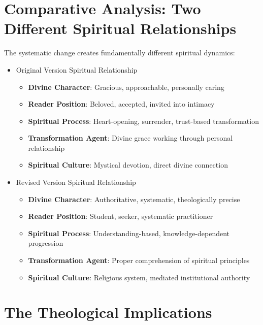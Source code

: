 \documentclass[11pt,twoside]{book}
\begin{document}
\section*{Comparative Analysis: Two Different Spiritual Relationships}
\label{sec:orge22e9e4}

The systematic change creates fundamentally different spiritual dynamics:
\begin{itemize}
\item Original Version Spiritual Relationship
\label{sec:org5c1df6e}
\begin{itemize}
\item \textbf{\textbf{Divine Character}}: Gracious, approachable, personally caring
\item \textbf{\textbf{Reader Position}}: Beloved, accepted, invited into intimacy
\item \textbf{\textbf{Spiritual Process}}: Heart-opening, surrender, trust-based transformation
\item \textbf{\textbf{Transformation Agent}}: Divine grace working through personal relationship
\item \textbf{\textbf{Spiritual Culture}}: Mystical devotion, direct divine connection
\end{itemize}
\item Revised Version Spiritual Relationship
\label{sec:org80bb000}
\begin{itemize}
\item \textbf{\textbf{Divine Character}}: Authoritative, systematic, theologically precise
\item \textbf{\textbf{Reader Position}}: Student, seeker, systematic practitioner
\item \textbf{\textbf{Spiritual Process}}: Understanding-based, knowledge-dependent progression
\item \textbf{\textbf{Transformation Agent}}: Proper comprehension of spiritual principles
\item \textbf{\textbf{Spiritual Culture}}: Religious system, mediated institutional authority
\end{itemize}
\end{itemize}
\section*{The Theological Implications}
\label{sec:org9b6c7e2}
\end{document}
